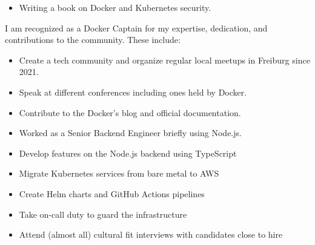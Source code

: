 \documentclass[10pt,a4paper]{altacv}
\begin{document}
    

\divider


\begin{itemize}
    \item Writing a book on Docker and Kubernetes security.
\end{itemize}

\divider


I am recognized as a Docker Captain for my expertise, dedication, and contributions to the community. These include:

\begin{itemize}
    \item Create a tech community and organize regular local meetups in Freiburg since 2021.
    \item Speak at different conferences including ones held by Docker.
    \item Contribute to the Docker's blog and official documentation.
\end{itemize}

\divider


\begin{itemize}
    \item Worked as a Senior Backend Engineer briefly using Node.js.
\end{itemize}

\clearpage





\begin{itemize}
    \item Develop features on the Node.js backend using TypeScript
    \item Migrate Kubernetes services from bare metal to AWS
    \item Create Helm charts and GitHub Actions pipelines
    \item Take on-call duty to guard the infrastructure
    \item Attend (almost all) cultural fit interviews with candidates close to hire
\end{itemize}
\end{document}
